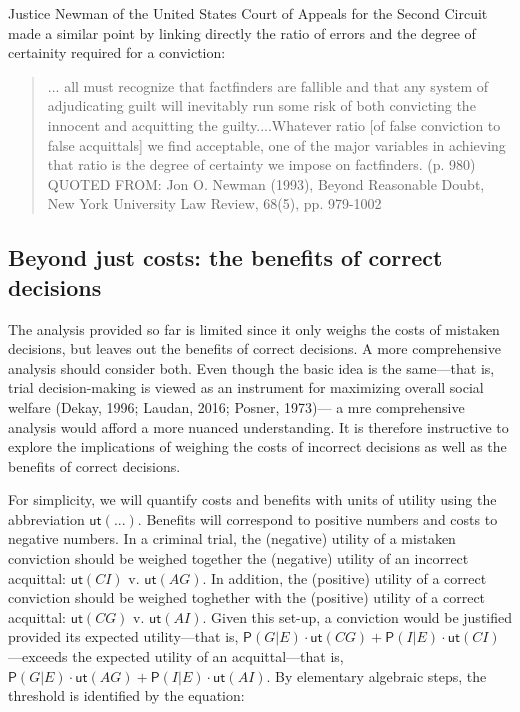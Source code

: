 \documentclass[10pt,dvipsnames,enabledeprecatedfontcommands]{scrartcl}
\newcommand{\pr}[1]{\mathsf{P}(#1)}
\newcommand{\ut}{\mathsf{ut}}
\begin{document}
\noindent Justice Newman of the United States Court of Appeals for the
Second Circuit made a similar point by linking directly the ratio of
errors and the degree of certainity required for a conviction:

\begin{quote}
... all must recognize that factfinders are
fallible and that any system of adjudicating guilt will inevitably run some
risk of both convicting the innocent and acquitting the guilty....Whatever ratio [of false conviction to false acquittals] we find acceptable, one of the major variables in achieving that ratio is the degree of certainty we impose on factfinders. (p. 980)
QUOTED FROM: Jon O. Newman (1993), Beyond Reasonable Doubt, New York University Law Review, 68(5), pp. 979-1002
\end{quote}

\hypertarget{beyond-just-costs-the-benefits-of-correct-decisions}{%
\subsection{Beyond just costs: the benefits of correct
decisions}\label{beyond-just-costs-the-benefits-of-correct-decisions}}

The analysis provided so far is limited since it only weighs the costs
of mistaken decisions, but leaves out the benefits of correct decisions.
A more comprehensive analysis should consider both. Even though the
basic idea is the same---that is, trial decision-making is viewed as an
instrument for maximizing overall social welfare (Dekay, 1996; Laudan,
2016; Posner, 1973)--- a mre comprehensive analysis would afford a more
nuanced understanding. It is therefore instructive to explore the
implications of weighing the costs of incorrect decisions as well as the
benefits of correct decisions.

For simplicity, we will quantify costs and benefits with units of
utility using the abbreviation \(\ut(...)\). Benefits will correspond to
positive numbers and costs to negative numbers. In a criminal trial, the
(negative) utility of a mistaken conviction should be weighed together
the (negative) utility of an incorrect acquittal: \(\ut(CI)\) v.
\(\ut(AG)\). In addition, the (positive) utility of a correct conviction
should be weighed toghether with the (positive) utility of a correct
acquittal: \(\ut(CG)\) v. \(\ut(AI)\). Given this set-up, a conviction
would be justified provided its expected utility---that is,
\(\pr{G | E} \cdot \ut(CG) + \pr{I | E } \cdot \ut(CI)\)---exceeds the
expected utility of an acquittal---that is,
\(\pr{G | E} \cdot \ut(AG) + \pr{I | E} \cdot \ut(AI)\). By elementary
algebraic steps, the threshold is identified by the equation:
\end{document}
